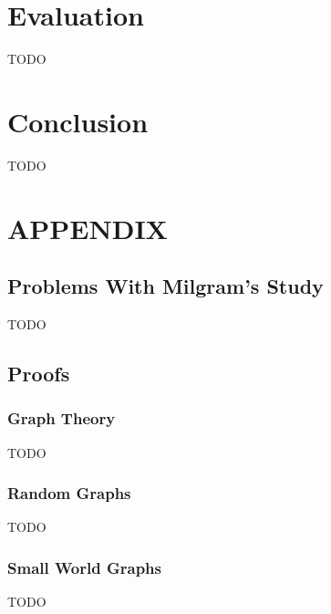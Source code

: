 \documentclass{article}
\begin{document}
                

                    
        
        
    \section{Evaluation}
    TODO
    \section{Conclusion}
    TODO

    \section{APPENDIX}
        \subsection{Problems With Milgram's Study}
        TODO
        \subsection{Proofs}
            \subsubsection{Graph Theory}
            TODO
            \subsubsection{Random Graphs}
            TODO
            \subsubsection{Small World Graphs}
            TODO
\end{document}
